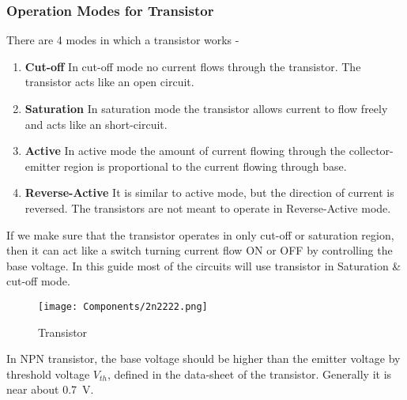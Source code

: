 \subsubsection{Operation Modes for Transistor}
There are 4 modes in which a transistor works -
\begin{enumerate}
    \item \textbf{Cut-off}
    In cut-off mode no current flows through the transistor. The transistor acts like an open circuit.
    \item \textbf{Saturation}
    In saturation mode the transistor allows current to flow freely and acts like an short-circuit.
    \item \textbf{Active}
    In active mode the amount of current flowing through the collector-emitter region is proportional to the current flowing through base.
    \item \textbf{Reverse-Active}
    It is similar to active mode, but the direction of current is reversed. The transistors are not meant to operate in Reverse-Active mode.
\end{enumerate}
If we make sure that the transistor operates in only cut-off or saturation region, then it can act like a switch turning current flow ON or OFF by controlling the base voltage. In this guide most of the circuits will use transistor in Saturation \& cut-off mode.
\begin{figure}[!ht]
    \centering
    \texttt{[image: Components/2n2222.png]}
    \caption{Transistor}
    \label{fig:npn_code}
\end{figure}
In NPN transistor, the base voltage should be higher than the emitter voltage by threshold voltage $V_{th}$, defined in the data-sheet of the transistor. Generally it is near about \SI{0.7}{\volt}.

